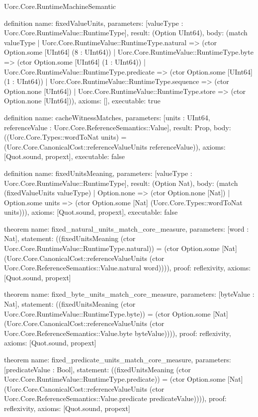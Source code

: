 \begin{lexlean}{Uorc.Core.RuntimeMachineSemantic}
\begin{semanticmodule}
definition{
  name: fixedValueUnits,
  parameters: [valueType : Uorc.Core.RuntimeValue::RuntimeType],
  result: (Option UInt64),
  body: (match valueType
    | Uorc.Core.RuntimeValue::RuntimeType.natural => (ctor Option.some [UInt64] (8 : UInt64))
    | Uorc.Core.RuntimeValue::RuntimeType.byte => (ctor Option.some [UInt64] (1 : UInt64))
    | Uorc.Core.RuntimeValue::RuntimeType.predicate => (ctor Option.some [UInt64] (1 : UInt64))
    | Uorc.Core.RuntimeValue::RuntimeType.sequence => (ctor Option.none [UInt64])
    | Uorc.Core.RuntimeValue::RuntimeType.store => (ctor Option.none [UInt64])),
  axioms: [],
  executable: true
}

definition{
  name: cacheWitnessMatches,
  parameters: [units : UInt64, referenceValue : Uorc.Core.ReferenceSemantics::Value],
  result: Prop,
  body: ((Uorc.Core.Types::wordToNat units) = (Uorc.Core.CanonicalCost::referenceValueUnits referenceValue)),
  axioms: [Quot.sound, propext],
  executable: false
}

definition{
  name: fixedUnitsMeaning,
  parameters: [valueType : Uorc.Core.RuntimeValue::RuntimeType],
  result: (Option Nat),
  body: (match (fixedValueUnits valueType)
    | Option.none => (ctor Option.none [Nat])
    | Option.some units => (ctor Option.some [Nat] (Uorc.Core.Types::wordToNat units))),
  axioms: [Quot.sound, propext],
  executable: false
}

theorem{
  name: fixed_natural_units_match_core_measure,
  parameters: [word : Nat],
  statement: ((fixedUnitsMeaning (ctor Uorc.Core.RuntimeValue::RuntimeType.natural)) = (ctor Option.some [Nat] (Uorc.Core.CanonicalCost::referenceValueUnits (ctor Uorc.Core.ReferenceSemantics::Value.natural word)))),
  proof: reflexivity{},
  axioms: [Quot.sound, propext]
}

theorem{
  name: fixed_byte_units_match_core_measure,
  parameters: [byteValue : Nat],
  statement: ((fixedUnitsMeaning (ctor Uorc.Core.RuntimeValue::RuntimeType.byte)) = (ctor Option.some [Nat] (Uorc.Core.CanonicalCost::referenceValueUnits (ctor Uorc.Core.ReferenceSemantics::Value.byte byteValue)))),
  proof: reflexivity{},
  axioms: [Quot.sound, propext]
}

theorem{
  name: fixed_predicate_units_match_core_measure,
  parameters: [predicateValue : Bool],
  statement: ((fixedUnitsMeaning (ctor Uorc.Core.RuntimeValue::RuntimeType.predicate)) = (ctor Option.some [Nat] (Uorc.Core.CanonicalCost::referenceValueUnits (ctor Uorc.Core.ReferenceSemantics::Value.predicate predicateValue)))),
  proof: reflexivity{},
  axioms: [Quot.sound, propext]
}


\end{semanticmodule}
\end{lexlean}
